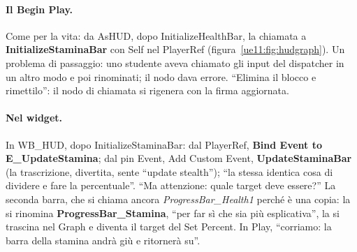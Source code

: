 \paragraph{Il Begin Play.} Come per la vita: da AsHUD, dopo InitializeHealthBar, la
chiamata a \textbf{InitializeStaminaBar} con Self nel PlayerRef (figura~\ref{ue11:fig:hudgraph}).
Un problema di passaggio: uno studente aveva chiamato gli input del dispatcher in un altro
modo e poi rinominati; il nodo dava errore. ``Elimina il blocco e rimettilo'': il nodo di
chiamata si rigenera con la firma aggiornata.

\paragraph{Nel widget.} In WB\_HUD, dopo InitializeStaminaBar: dal PlayerRef, \textbf{Bind
Event to E\_UpdateStamina}; dal pin Event, Add Custom Event, \textbf{UpdateStaminaBar} (la
trascrizione, divertita, sente ``update stealth''); ``la stessa identica cosa di dividere e
fare la percentuale''. ``Ma attenzione: quale target deve essere?'' La seconda barra, che
si chiama ancora \emph{ProgressBar\_Health1} perché è una copia: la si rinomina
\textbf{ProgressBar\_Stamina}, ``per far sì che sia più esplicativa'', la si trascina nel
Graph e diventa il target del Set Percent. In Play, ``corriamo: la barra della stamina
andrà giù e ritornerà su''.

